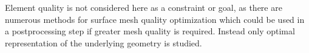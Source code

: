 Element quality is not considered here as a constraint or goal, as there
are numerous methods for surface mesh quality optimization
\cite{frey1998,garimella2002,garimella2004a,garimella2004b,jiao2005,jiao2006,jiao2011,jiao2013,lopez2008,montenegro2005,montenegro2006,montenegro2008,montenegro2011,roca2012,roca2013,shivanna2010,zhang2009}
which could be used in a postprocessing step if greater mesh quality is
required.  Instead only optimal representation of the underlying
geometry is studied.

